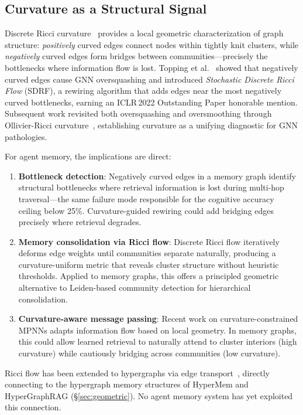 \documentclass[hf]{ceurart}
\begin{document}
\subsection{Curvature as a Structural Signal}
\label{sec:curvature}

Discrete Ricci curvature~\cite{topping2022} provides a local geometric
characterization of graph structure: \emph{positively} curved edges
connect nodes within tightly knit clusters, while \emph{negatively}
curved edges form bridges between communities---precisely the
bottlenecks where information flow is lost. Topping et
al.~\cite{topping2022} showed that negatively curved edges cause GNN
oversquashing and introduced \emph{Stochastic Discrete Ricci Flow}
(SDRF), a rewiring algorithm that adds edges near the most negatively
curved bottlenecks, earning an ICLR\,2022 Outstanding Paper honorable
mention. Subsequent work revisited both oversquashing and oversmoothing
through Ollivier-Ricci curvature~\cite{revisitingricci2023},
establishing curvature as a unifying diagnostic for GNN pathologies.

For agent memory, the implications are direct:
\begin{enumerate}
\item \textbf{Bottleneck detection}: Negatively curved edges in a
  memory graph identify structural bottlenecks where retrieval
  information is lost during multi-hop traversal---the same failure
  mode responsible for the cognitive accuracy ceiling below 25\%.
  Curvature-guided rewiring could add bridging edges precisely where
  retrieval degrades.
\item \textbf{Memory consolidation via Ricci flow}: Discrete Ricci flow
  iteratively deforms edge weights until communities separate
  naturally, producing a curvature-uniform metric that reveals
  cluster structure without heuristic thresholds. Applied to memory
  graphs, this offers a principled geometric alternative to Leiden-based
  community detection for hierarchical consolidation.
\item \textbf{Curvature-aware message passing}: Recent work on
  curvature-constrained MPNNs adapts information flow based on local
  geometry. In memory graphs, this could allow learned retrieval to
  naturally attend to cluster interiors (high curvature) while
  cautiously bridging across communities (low curvature).
\end{enumerate}

Ricci flow has been extended to hypergraphs via edge
transport~\cite{hypergraphricci2024}, directly connecting to the
hypergraph memory structures of HyperMem and HyperGraphRAG
(\S\ref{sec:geometric}). No agent memory system has yet exploited this
connection.
\end{document}
